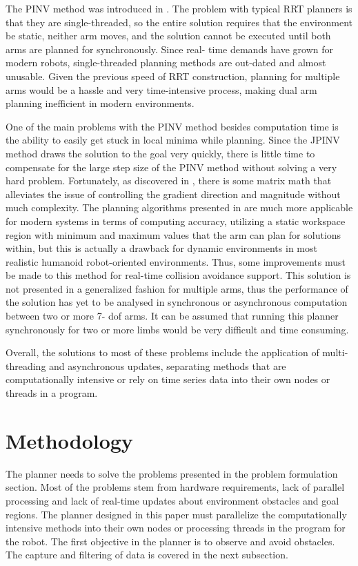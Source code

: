 \documentclass[conference]{IEEEtran} \usepackage[T1]{fontenc} \usepackage[backend=biber, style=ieee]{biblatex}
\begin{document}
The PINV method was introduced in \cite{humanoid_motion_planning}. The problem with typical RRT planners is that they are single-threaded, so the entire solution 
requires that the environment be static, neither arm moves, and the solution cannot be executed until both arms are planned for synchronously. Since real-
time demands have grown for modern robots, single-threaded planning methods are out-dated and almost unusable. Given the previous speed of RRT
construction, planning for multiple arms would be a hassle and very time-intensive process, making dual arm planning inefficient in modern environments.

One of the main problems with the PINV method besides computation time is the ability to easily get stuck in local minima while planning. Since the JPINV method draws
the solution to the goal very quickly, there is little time to compensate for the large step size of the PINV method without solving a very hard problem. Fortunately,
as discovered in \cite{wgr_planning}, there is some matrix math that alleviates the issue of controlling the gradient direction and magnitude without much complexity. 
The planning algorithms presented in \cite{wgr_planning} are much more applicable for modern systems in terms of computing accuracy, utilizing a static workspace 
region with minimum and maximum values that the arm can plan for solutions within, but this is actually a drawback for dynamic environments in most realistic humanoid 
robot-oriented environments. Thus, some improvements must be made to this method for real-time collision avoidance support. This solution is not presented in a 
generalized fashion for multiple arms, thus the performance of the solution has yet to be analysed in synchronous or asynchronous computation between two or more 7-
dof arms. It can be assumed that running this planner synchronously for two or more limbs would be very difficult and time consuming. 

Overall, the solutions to most of these problems include the application of multi-threading and asynchronous updates, separating methods that are computationally 
intensive or rely on time series data into their own nodes or threads in a program.

\section{Methodology} \label{Methodology}

The planner needs to solve the problems presented in the problem formulation section. Most of the problems stem from hardware requirements, lack of parallel processing and 
lack of real-time updates about environment obstacles and goal regions. The planner designed in this paper must parallelize the computationally intensive methods into 
their own nodes or processing threads in the program for the robot. The first objective in the planner is to observe and avoid obstacles. The capture and filtering of data is covered in the next subsection.
\end{document}

